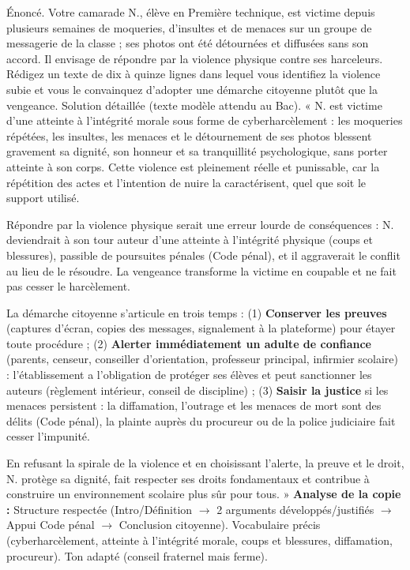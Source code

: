 \documentclass[11pt]{article}
\newcommand{\cle}[1]{{\popxbold\color{popdark}#1}}
\begin{document}
\begin{exoresolu}
Énoncé. Votre camarade N., élève en Première technique, est victime depuis plusieurs semaines de moqueries, d'insultes et de menaces sur un groupe de messagerie de la classe ; ses photos ont été détournées et diffusées sans son accord. Il envisage de répondre par la violence physique contre ses harceleurs. Rédigez un texte de dix à quinze lignes dans lequel vous identifiez la violence subie et vous le convainquez d'adopter une démarche citoyenne plutôt que la vengeance.
\tcblower
Solution détaillée (texte modèle attendu au Bac).
« N. est victime d'une \cle{atteinte à l'intégrité morale} sous forme de \cle{cyberharcèlement} : les moqueries répétées, les insultes, les menaces et le détournement de ses photos blessent gravement sa dignité, son honneur et sa tranquillité psychologique, sans porter atteinte à son corps. Cette violence est pleinement réelle et punissable, car la répétition des actes et l'intention de nuire la caractérisent, quel que soit le support utilisé.

Répondre par la violence physique serait une erreur lourde de conséquences : N. deviendrait à son tour auteur d'une \cle{atteinte à l'intégrité physique} (coups et blessures), passible de poursuites pénales (Code pénal), et il aggraverait le conflit au lieu de le résoudre. La vengeance transforme la victime en coupable et ne fait pas cesser le harcèlement.

La démarche citoyenne s'articule en trois temps : (1) \textbf{Conserver les preuves} (captures d'écran, copies des messages, signalement à la plateforme) pour étayer toute procédure ; (2) \textbf{Alerter immédiatement un adulte de confiance} (parents, censeur, conseiller d'orientation, professeur principal, infirmier scolaire) : l'établissement a l'obligation de protéger ses élèves et peut sanctionner les auteurs (règlement intérieur, conseil de discipline) ; (3) \textbf{Saisir la justice} si les menaces persistent : la diffamation, l'outrage et les menaces de mort sont des délits (Code pénal), la plainte auprès du procureur ou de la police judiciaire fait cesser l'impunité.

En refusant la spirale de la violence et en choisissant l'alerte, la preuve et le droit, N. protège sa dignité, fait respecter ses droits fondamentaux et contribue à construire un environnement scolaire plus sûr pour tous. »
\textbf{Analyse de la copie :} Structure respectée (Intro/Définition $\rightarrow$ 2 arguments développés/justifiés $\rightarrow$ Appui Code pénal $\rightarrow$ Conclusion citoyenne). Vocabulaire précis (cyberharcèlement, atteinte à l'intégrité morale, coups et blessures, diffamation, procureur). Ton adapté (conseil fraternel mais ferme).
\end{exoresolu}
\end{document}
